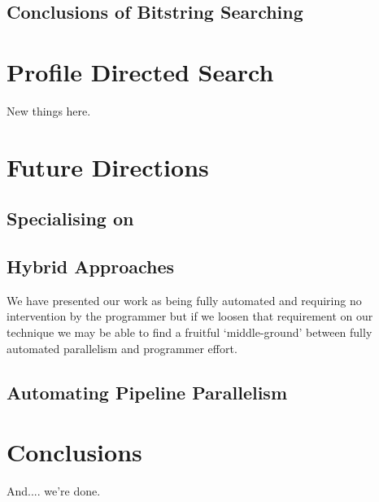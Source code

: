 \documentclass[justified, twoside, a4paper, symmetric]{tufte-book}
\begin{document}
    \section{Conclusions of Bitstring Searching}
    \label{sec:blind-Conclusion}
    

\chapter{Profile Directed Search}

    New things here.
    \label{sec:informed-search}
    


\chapter{Future Directions}

    \section{Specialising on \underline{\hspace{2cm}}}

    \section{Hybrid Approaches}

        We have presented our work as being fully automated and requiring no
        intervention by the programmer but if we loosen that requirement on
        our technique we may be able to find a fruitful `middle-ground' between
        fully automated parallelism and programmer effort.

    \section{Automating Pipeline Parallelism}


\chapter{Conclusions}

    And.... we're done.

\listoftodos[Notes]

\backmatter



\end{document}
